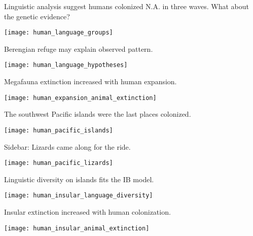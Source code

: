 \documentclass[t]{beamer}
\begin{document}
\begin{frame}{Linguistic analysis suggest humans colonized N.A. in three waves. What about the genetic evidence?}
	\vspace{-0.5\baselineskip}
	\begin{center}
		\texttt{[image: human\_language\_groups]}
	\end{center}
\end{frame}

\begin{frame}[t]{Berengian refuge may explain observed pattern.}
	\vspace{-\baselineskip}
	\begin{center}
		\texttt{[image: human\_language\_hypotheses]}
	\end{center}
\end{frame}

\begin{frame}[t]{Megafauna extinction increased with human expansion.}
	\vspace{-\baselineskip}
	\begin{center}
		\texttt{[image: human\_expansion\_animal\_extinction]}
	\end{center}
\end{frame}

\begin{frame}{The southwest Pacific islands were the last places colonized.}
	\vspace{-\baselineskip}
	\begin{center}
		\texttt{[image: human\_pacific\_islands]}
	\end{center}
\end{frame}

\begin{frame}{Sidebar: Lizards came along for the ride.}
	\vspace{-\baselineskip}
	\begin{center}
		\texttt{[image: human\_pacific\_lizards]}
	\end{center}
\end{frame}


\begin{frame}{Linguistic diversity on islands fits the IB model.}
	\vspace{-\baselineskip}
	\begin{center}
		\texttt{[image: human\_insular\_language\_diversity]}
	\end{center}
\end{frame}

\begin{frame}{Insular extinction increased with human colonization.}
	\vspace{-0.5\baselineskip}
	\begin{center}
		\texttt{[image: human\_insular\_animal\_extinction]}
	\end{center}
\end{frame}
\end{document}
